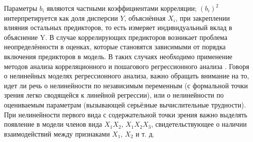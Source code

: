 Параметры $b_i$ являются частными коэффициентами корреляции; $(b_i)^2$ интерпретируется как доля дисперсии $Y$, объяснённая $X_i$, при закреплении влияния остальных предикторов, то есть измеряет индивидуальный вклад  в объяснение Y. В случае коррелирующих предикторов возникает проблема неопределённости в оценках, которые становятся зависимыми от порядка включения предикторов в модель. В таких случаях необходимо применение методов анализа корреляционного и пошагового регрессионного анализа \cite{statseval}.
Говоря о нелинейных моделях регрессионного анализа, важно обращать внимание на то, идет ли речь о нелинейности по независимым переменным (с формальной точки зрения легко сводящейся к линейной регрессии), или о нелинейности по оцениваемым параметрам (вызывающей серьёзные вычислительные трудности). При нелинейности первого вида с содержательной точки зрения важно выделять появление в модели членов вида $X_1 X_2$, $X_1 X_2 X_3$, свидетельствующее о наличии взаимодействий между признаками $X_1$, $X_2$ и т. д.